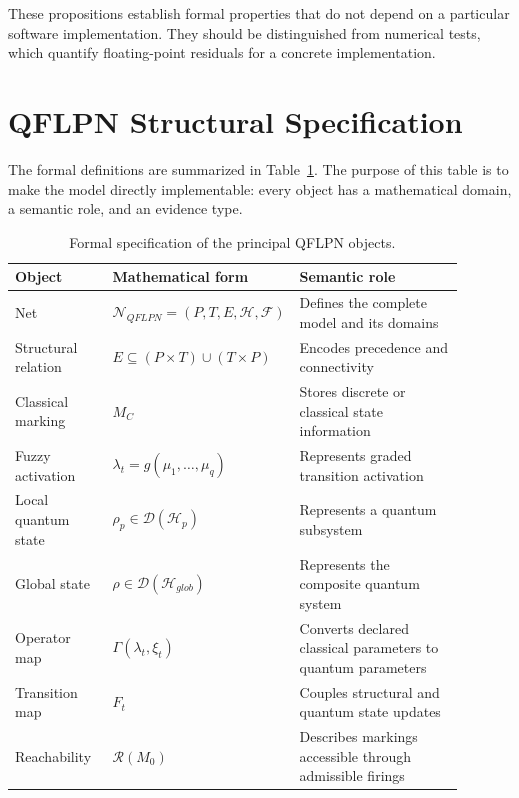 \documentclass[final,3p,times]{elsarticle}
\begin{document}
These propositions establish formal properties that do not depend on a particular software implementation. They should be distinguished from numerical tests, which quantify floating-point residuals for a concrete implementation.

\section{QFLPN Structural Specification}

The formal definitions are summarized in Table~\ref{tab:qflpn-spec}. The purpose of this table is to make the model directly implementable: every object has a mathematical domain, a semantic role, and an evidence type. 

\begin{table}[tbp]
    \centering
    \caption{Formal specification of the principal QFLPN objects.}
    \label{tab:qflpn-spec}
\begin{tabular}{p{0.22\linewidth} p{0.28\linewidth} p{0.39\linewidth}}
        \toprule
        Object              & Mathematical form                                     & Semantic role                                                \\
        \midrule
        Net                 & $\mathcal{N}_{QFLPN}=(P,T,E,\mathcal{H},\mathcal{F})$ & Defines the complete model and its domains                   \\
        Structural relation & $E\subseteq(P\times T)\cup(T\times P)$                & Encodes precedence and connectivity                          \\
        Classical marking   & $M_C$                                                 & Stores discrete or classical state information               \\
        Fuzzy activation    & $\lambda_t=g(\mu_1,\ldots,\mu_q)$                     & Represents graded transition activation                      \\
        Local quantum state & $\rho_p\in\mathcal{D}(\mathcal{H}_p)$                 & Represents a quantum subsystem                               \\
        Global state        & $\rho\in\mathcal{D}(\mathcal{H}_{glob})$              & Represents the composite quantum system                      \\
        Operator map        & $\Gamma(\lambda_t,\xi_t)$                             & Converts declared classical parameters to quantum parameters \\
        Transition map      & $F_t$                                                 & Couples structural and quantum state updates                 \\
        Reachability        & $\mathcal{R}(M_0)$                                    & Describes markings accessible through admissible firings     \\
        \bottomrule
\end{tabular}\end{table}
\end{document}
